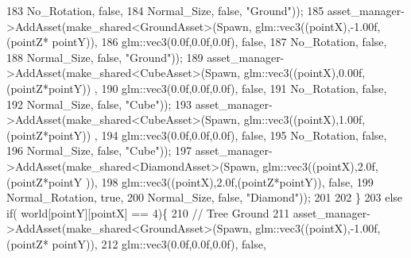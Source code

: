 \begin{DoxyCode}
183                                                              No\_Rotation, \textcolor{keyword}{false},
184                                                              Normal\_Size, \textcolor{keyword}{false}, \textcolor{stringliteral}{"Ground"}));
185             asset\_manager->AddAsset(make\_shared<GroundAsset>(Spawn, glm::vec3((pointX),-1.00f,(pointZ*
      pointY)),
186                                                              glm::vec3(0.0f,0.0f,0.0f), \textcolor{keyword}{false},
187                                                              No\_Rotation, \textcolor{keyword}{false},
188                                                              Normal\_Size, \textcolor{keyword}{false}, \textcolor{stringliteral}{"Ground"}));
189             asset\_manager->AddAsset(make\_shared<CubeAsset>(Spawn, glm::vec3((pointX),0.00f,(pointZ*pointY))
      , 
190                                                            glm::vec3(0.0f,0.0f,0.0f), \textcolor{keyword}{false},
191                                                            No\_Rotation, \textcolor{keyword}{false},
192                                                            Normal\_Size, \textcolor{keyword}{false}, \textcolor{stringliteral}{"Cube"}));
193             asset\_manager->AddAsset(make\_shared<CubeAsset>(Spawn, glm::vec3((pointX),1.00f,(pointZ*pointY))
      , 
194                                                            glm::vec3(0.0f,0.0f,0.0f), \textcolor{keyword}{false},
195                                                            No\_Rotation, \textcolor{keyword}{false},
196                                                            Normal\_Size, \textcolor{keyword}{false}, \textcolor{stringliteral}{"Cube"}));
197             asset\_manager->AddAsset(make\_shared<DiamondAsset>(Spawn, glm::vec3((pointX),2.0f,(pointZ*pointY
      )), 
198                                                              glm::vec3((pointX),2.0f,(pointZ*pointY)), \textcolor{keyword}{
      false},
199                                                              Normal\_Rotation, \textcolor{keyword}{true},
200                                                              Normal\_Size, \textcolor{keyword}{false}, \textcolor{stringliteral}{"Diamond"}));
201 
202    \}
203    \textcolor{keywordflow}{else} \textcolor{keywordflow}{if}( world[pointY][pointX] == 4)\{
210             \textcolor{comment}{// Tree Ground}
211             asset\_manager->AddAsset(make\_shared<GroundAsset>(Spawn, glm::vec3((pointX),-1.00f,(pointZ*
      pointY)),
212                                                              glm::vec3(0.0f,0.0f,0.0f), \textcolor{keyword}{false},

\end{DoxyCode}
